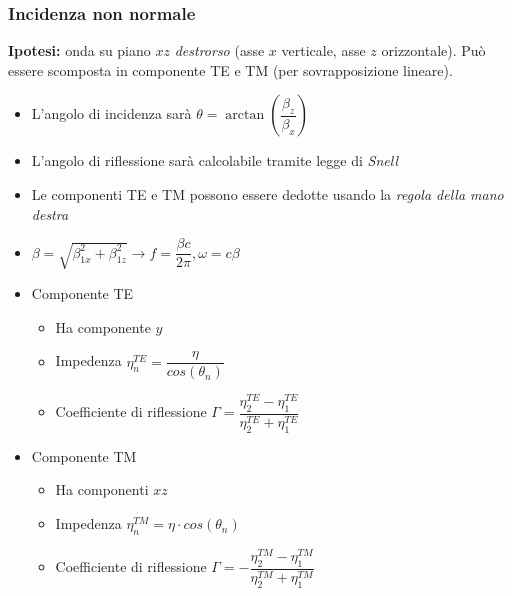 \documentclass{article}
\begin{document}
\subsubsection{Incidenza non normale}
\textbf{Ipotesi:} onda su piano \(xz\) \textit{destrorso} (asse \(x\) verticale, asse \(z\) orizzontale). Può essere scomposta in componente TE e TM (per sovrapposizione lineare).
\begin{itemize}
	\item L'angolo di incidenza sarà \(\theta = \arctan\left(\dfrac{\beta_z}{\beta_x}\right)\)
	\item L'angolo di riflessione sarà calcolabile tramite legge di \textit{Snell}
	\item Le componenti TE e TM possono essere dedotte usando la \textit{regola della mano destra}
	\item \(\beta = \displaystyle \sqrt{\beta_{1x} ^ 2 + \beta_{1z} ^2} \rightarrow f = \dfrac{\beta c}{2 \pi}, \omega = c \beta \)
\end{itemize}
\begin{itemize}
	\item Componente TE
	      \begin{itemize}
		      \item Ha componente \(y\)
		      \item Impedenza \( \displaystyle \eta^{TE}_n = \dfrac{\eta}{cos(\theta_n)} \)
		      \item Coefficiente di riflessione \(\displaystyle \Gamma = \dfrac{\eta_{2}^{TE} - \eta_{1}^{TE}}{\eta_{2}^{TE} + \eta_{1}^{TE}} \)
	      \end{itemize}
	\item Componente TM
	      \begin{itemize}
		      \item Ha componenti \(xz\)
		      \item Impedenza \(\displaystyle \eta^{TM}_n = \eta \cdot cos(\theta_n) \)
		      \item Coefficiente di riflessione \(\displaystyle \Gamma = - \dfrac{\eta_{2}^{TM} - \eta_{1}^{TM}}{\eta_{2}^{TM} + \eta_{1}^{TM}} \)
	      \end{itemize}
\end{itemize}
\end{document}
